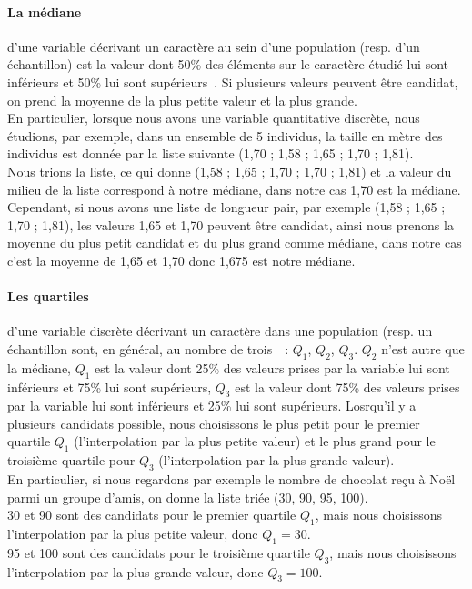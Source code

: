 \documentclass[12pt]{article}
\begin{document}
\paragraph{La médiane} d'une variable décrivant un caractère au sein d'une population (resp. d'un échantillon) est la valeur dont 50\% des éléments sur le caractère étudié lui sont inférieurs et 50\% lui sont supérieurs~\cite{stats}. Si plusieurs valeurs peuvent être candidat, on prend la moyenne de la plus petite valeur et la plus grande.\\
En particulier, lorsque nous avons une variable quantitative discrète, nous étudions, par exemple, dans un ensemble de 5 individus, la taille en mètre des individus est donnée par la liste suivante (1,70 ; 1,58 ; 1,65 ; 1,70 ; 1,81).\\
Nous trions la liste, ce qui donne (1,58 ; 1,65 ; 1,70 ; 1,70 ; 1,81) et la valeur du milieu de la liste correspond à notre médiane, dans notre cas 1,70 est la médiane.\\
Cependant, si nous avons une liste de longueur pair, par exemple (1,58 ; 1,65 ; 1,70 ; 1,81), les valeurs 1,65 et 1,70 peuvent être candidat, ainsi nous prenons la moyenne du plus petit candidat et du plus grand comme médiane, dans notre cas c'est la moyenne de 1,65 et 1,70 donc 1,675 est notre médiane.

\paragraph{Les quartiles} d'une variable discrète décrivant un caractère dans une population (resp. un échantillon sont, en général, au nombre de trois~\cite{quart}~: $Q_1$, $Q_2$, $Q_3$. $Q_2$ n'est autre que la médiane, $Q_1$ est la valeur dont 25\% des valeurs prises par la variable lui sont inférieurs et 75\% lui sont supérieurs, $Q_3$ est la valeur dont 75\% des valeurs prises par la variable lui sont inférieurs et 25\% lui sont supérieurs. Losrqu'il y a plusieurs candidats possible, nous choisissons le plus petit pour le premier quartile $Q_1$ (l'interpolation par la plus petite valeur) et le plus grand pour le troisième quartile pour $Q_3$ (l'interpolation par la plus grande valeur).\\
En particulier, si nous regardons par exemple le nombre de chocolat reçu à Noël parmi un groupe d'amis, on donne la liste triée (30, 90, 95, 100).\\
30 et 90 sont des candidats pour le premier quartile $Q_1$, mais nous choisissons l'interpolation par la plus petite valeur, donc $Q_1 = 30$.\\
95 et 100 sont des candidats pour le troisième quartile $Q_3$, mais nous choisissons l'interpolation par la plus grande valeur, donc $Q_3 = 100$.\\
\end{document}
